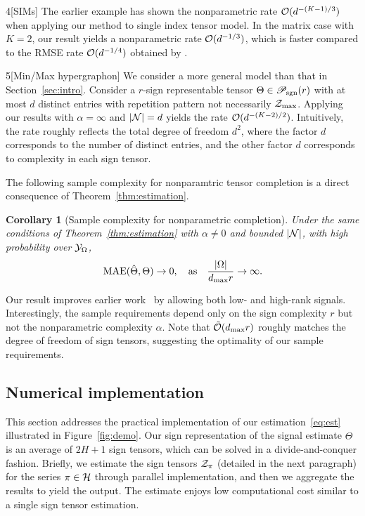 \documentclass[useAMS,usenatbib,usegraphicx,referee]{biom}
\theoremstyle{plain}
\newtheorem{cor}{Corollary}
\theoremstyle{definition}
\def\caliP{\mathscr{P}_{\textup{sgn}}}
\begin{document}
\begin{customexample}{4}[SIMs]
The earlier example has shown the nonparametric rate $\mathcal{O}(d^{-(K-1)/3})$ when applying our method to single index tensor model. In the matrix case with $K=2$, our result yields a nonparametric rate $\mathcal{O}(d^{-1/3})$, which is faster compared to the RMSE rate $\mathcal{O}(d^{-1/4})$ obtained by \cite{ganti2015matrix}. 

\end{customexample}

\begin{customexample}{5}[Min/Max hypergraphon]
We consider a more general model than that in Section~\ref{sec:intro}. Consider a $r$-sign representable tensor $\Theta\in \caliP(r)$ with at most $d$ distinct entries with repetition pattern not necessarily $\mathcal{Z}_{\max}$. Applying our results with $\alpha=\infty$ and $|\mathcal{N}|=d$ yields the rate $\mathcal{O}(d^{-(K-2)/2})$. Intuitively, the rate roughly reflects the total degree of freedom $d^2$, where the factor $d$ corresponds to the number of distinct entries, and the other factor $d$ corresponds to complexity in each sign tensor. 
\end{customexample}

The following sample complexity for nonparamtric tensor completion is a direct consequence of Theorem~\ref{thm:estimation}. 
\vspace{-.3cm}

\begin{cor}[Sample complexity for nonparametric completion] Under the same conditions of Theorem~\ref{thm:estimation} with $\alpha\neq 0$ and bounded $|\mathcal{N}|$, with high probability over $\mathcal{Y}_\Omega$, 
\[
\textup{MAE}(\hat \Theta, \Theta)\to 0, \quad \text{as}\quad {|\Omega|\over {d_{\max}} r}\to \infty.
\]
\end{cor}
Our result improves earlier work~\citep{yuan2016tensor,ghadermarzy2019near,pmlr-v119-lee20i} by allowing both low- and high-rank signals. Interestingly, the sample requirements depend only on the sign complexity $r$ but not the nonparametric complexity $\alpha$. Note that $\tilde {\mathcal{O}}(d_{\max}r)$ roughly matches the degree of freedom of sign tensors, suggesting the optimality of our sample requirements. 

\subsection{Numerical implementation}
This section addresses the practical implementation of our estimation~\eqref{eq:est} illustrated in Figure~\ref{fig:demo}. Our sign representation of the signal estimate $\hat \Theta$ is an average of $2H+1$ sign tensors, which can be solved in a divide-and-conquer fashion. Briefly, we estimate the sign tensors $\mathcal{Z}_\pi$ (detailed in the next paragraph) for the series $\pi \in \mathcal{H}$ through parallel implementation, and then we aggregate the results to yield the output. The estimate enjoys low computational cost similar to a single sign tensor estimation.  
\end{document}
